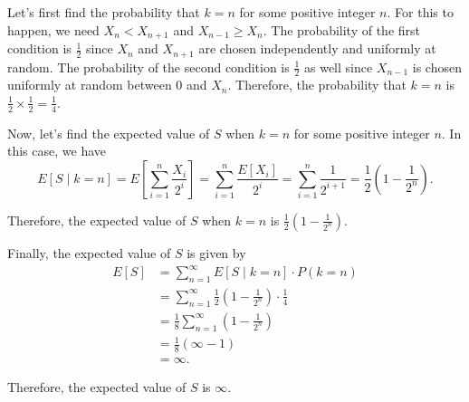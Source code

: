 Let's first find the probability that \( k = n \) for some positive integer \( n \). For this to happen, we need \( X_n < X_{n+1} \) and \( X_{n-1} \geq X_n \). The probability of the first condition is \( \frac{1}{2} \) since \( X_n \) and \( X_{n+1} \) are chosen independently and uniformly at random. The probability of the second condition is \( \frac{1}{2} \) as well since \( X_{n-1} \) is chosen uniformly at random between 0 and \( X_n \). Therefore, the probability that \( k = n \) is \( \frac{1}{2} \times \frac{1}{2} = \frac{1}{4} \).

Now, let's find the expected value of \( S \) when \( k = n \) for some positive integer \( n \). In this case, we have
\[ E[S \mid k = n] = E\left[\sum_{i=1}^n \frac{X_i}{2^i} \right] = \sum_{i=1}^n \frac{E[X_i]}{2^i} = \sum_{i=1}^n \frac{1}{2^{i+1}} = \frac{1}{2} \left(1 - \frac{1}{2^{n}}\right). \]

Therefore, the expected value of \( S \) when \( k = n \) is \( \frac{1}{2} \left(1 - \frac{1}{2^{n}}\right) \).

Finally, the expected value of \( S \) is given by
\begin{align*}
E[S] &= \sum_{n=1}^{\infty} E[S \mid k = n] \cdot P(k = n) \\
&= \sum_{n=1}^{\infty} \frac{1}{2} \left(1 - \frac{1}{2^{n}}\right) \cdot \frac{1}{4} \\
&= \frac{1}{8} \sum_{n=1}^{\infty} \left(1 - \frac{1}{2^{n}}\right) \\
&= \frac{1}{8} \left(\infty - 1\right) \\
&= \infty.
\end{align*}

Therefore, the expected value of \( S \) is \( \infty \).
